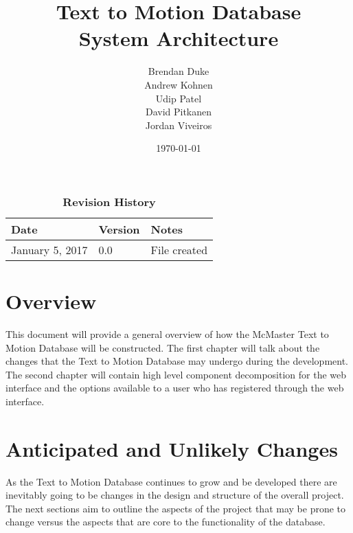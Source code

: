 \documentclass{scrreprt}
\begin{document}
\title{\bf Text to Motion Database\\[\baselineskip]\Large System Architecture}
\author{Brendan Duke\\Andrew Kohnen\\Udip Patel\\David Pitkanen\\Jordan Viveiros}
\date{\today}

\maketitle

\tableofcontents


\begin{table}[bp]
\caption*{\bf Revision History}
\begin{tabularx}{\textwidth}{p{3.5cm}p{2cm}X}
\toprule {\bf Date} & {\bf Version} & {\bf Notes}\\
\midrule
January 5, 2017 & 0.0 & File created\\
\bottomrule
\end{tabularx}
\end{table}

\newpage


\chapter{Overview}
This document will provide a general overview of how the McMaster Text to Motion Database will be constructed. The first chapter will talk about the changes that the Text to Motion Database may undergo during the development. The second chapter will contain high level component decomposition for the web interface and the options available to a user who has registered through the web interface.

\chapter{Anticipated and Unlikely Changes}
As the Text to Motion Database continues to grow and be developed there are inevitably going to be changes in the design and structure of the overall project. The next sections aim to outline the aspects of the project that may be prone to change versus the aspects that are core to the functionality of the database.
\end{document}

